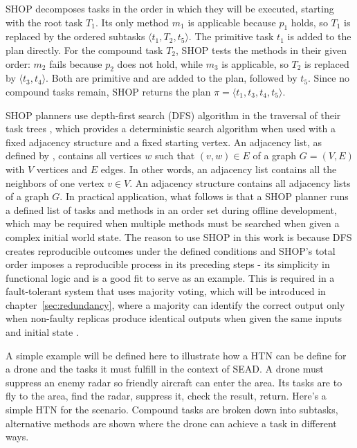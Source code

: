 

SHOP decomposes tasks in the order in which they will be executed, starting with the root task $T_1$. Its only method $m_1$ is applicable because $p_1$ holds, so $T_1$ is replaced by the ordered subtasks $\langle t_1, T_2, t_5 \rangle$. The primitive task $t_1$ is added to the plan directly. For the compound task $T_2$, SHOP tests the methods in their given order: $m_2$ fails because $p_2$ does not hold, while $m_3$ is applicable, so $T_2$ is replaced by $\langle t_3, t_4 \rangle$. Both are primitive and are added to the plan, followed by $t_5$. Since no compound tasks remain, SHOP returns the plan $\pi = \langle t_1, t_3, t_4, t_5 \rangle$.

SHOP planners use depth-first search (DFS) algorithm in the traversal of their task trees \parencite{nau_shop_1999}, which provides a deterministic search algorithm when used with a fixed adjacency structure \parencite{lammich_framework_2015} and a fixed starting vertex. An adjacency list, as defined by \textcite{tarjan_depth-first_1971}, contains all vertices $w$ such that $(v,w) \in E$ of a graph $G = (V,E)$ with $V$ vertices and $E$ edges. In other words, an adjacency list contains all the neighbors of one vertex $v\in V$. An adjacency structure contains all adjacency lists of a graph $G$. %
In practical application, what follows is that a SHOP planner runs a defined list of tasks and methods in an order set during offline development, which may be required when multiple methods must be searched when given a complex initial world state. The reason to use SHOP in this work is because DFS creates reproducible outcomes under the defined conditions and SHOP's total order imposes a reproducible process in its preceding steps - its simplicity in functional logic and is a good fit to serve as an example. This is required in a fault-tolerant system that uses majority voting, which will be introduced in chapter~\ref{sec:redundancy}, where a majority can identify the correct output only when non-faulty replicas produce identical outputs when given the same inputs and initial state \parencite{schneider_1990}.

A simple example will be defined here to illustrate how a HTN can be define for a drone and the tasks it must fulfill in the context of SEAD. A drone must suppress an enemy radar so friendly aircraft can enter the area. Its tasks are to fly to the area, find the radar, suppress it, check the result, return. Here's a simple HTN for the scenario. Compound tasks are broken down into subtasks, alternative methods are shown where the drone can achieve a task in different ways.

